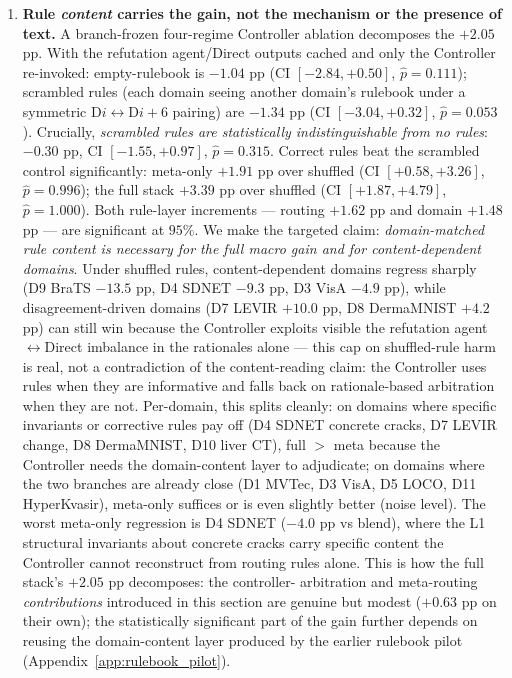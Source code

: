 \begin{enumerate}
\item \textbf{Rule \emph{content} carries the gain, not the mechanism
or the presence of text.} A branch-frozen four-regime Controller
ablation decomposes the $+2.05$ pp. With the refutation agent/Direct outputs cached and
only the Controller re-invoked: empty-rulebook is $-1.04$ pp (CI
$[-2.84, +0.50]$, $\hat p{=}0.111$); scrambled rules (each domain
seeing another domain's rulebook under a symmetric D$i{\leftrightarrow}$D$i{+}6$
pairing) are $-1.34$ pp (CI $[-3.04, +0.32]$, $\hat p{=}0.053$).
Crucially, \emph{scrambled rules are statistically indistinguishable
from no rules}: $-0.30$ pp, CI $[-1.55, +0.97]$, $\hat p{=}0.315$.
Correct rules beat the scrambled control significantly: meta-only
$+1.91$ pp over shuffled (CI $[+0.58, +3.26]$, $\hat p{=}0.996$); the
full stack $+3.39$ pp over shuffled (CI $[+1.87, +4.79]$, $\hat
p{=}1.000$). Both rule-layer increments --- routing $+1.62$ pp and
domain $+1.48$ pp --- are significant at $95\%$. We make the
targeted claim: \emph{domain-matched rule content is necessary for
the full macro gain and for content-dependent domains}. Under
shuffled rules, content-dependent domains regress sharply (D9 BraTS
$-13.5$ pp, D4 SDNET $-9.3$ pp, D3 VisA $-4.9$ pp), while
disagreement-driven domains (D7 LEVIR $+10.0$ pp, D8 DermaMNIST
$+4.2$ pp) can still win because the Controller exploits visible
the refutation agent$\leftrightarrow$Direct imbalance in the rationales alone --- this
cap on shuffled-rule harm is real, not a contradiction of the
content-reading claim: the Controller uses rules when they are
informative and falls back on rationale-based arbitration when they
are not.
Per-domain, this splits cleanly: on domains where specific
invariants or corrective rules pay off (D4 SDNET concrete cracks,
D7 LEVIR change, D8 DermaMNIST, D10 liver CT), full $>$ meta
because the Controller needs the domain-content layer to
adjudicate; on domains where the two branches are already close
(D1 MVTec, D3 VisA, D5 LOCO, D11 HyperKvasir), meta-only suffices
or is even slightly better (noise level). The worst meta-only
regression is D4 SDNET ($-4.0$ pp vs blend), where the L1
structural invariants about concrete cracks carry specific content
the Controller cannot reconstruct from routing rules alone. This
is how the full stack's $+2.05$ pp decomposes: the controller-
arbitration and meta-routing \emph{contributions} introduced in
this section are genuine but modest ($+0.63$ pp on their own); the
statistically significant part of the gain further depends on
reusing the domain-content layer produced by the earlier rulebook
pilot (Appendix~\ref{app:rulebook_pilot}).
\end{enumerate}

